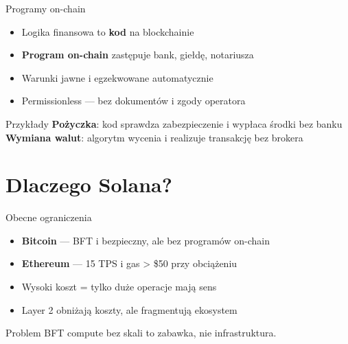 \begin{frame}{Programy on-chain}
  \begin{itemize}
    \item Logika finansowa to \textbf{kod} na blockchainie
    \item \textbf{Program on-chain} zastępuje bank, giełdę, notariusza
    \item Warunki jawne i egzekwowane automatycznie
    \item Permissionless --- bez dokumentów i zgody operatora
  \end{itemize}
  \vspace{0.3cm}
  \begin{exampleblock}{Przykłady}
    \textbf{Pożyczka}: kod sprawdza zabezpieczenie i wypłaca środki bez banku\\
    \textbf{Wymiana walut}: algorytm wycenia i realizuje transakcję bez brokera
  \end{exampleblock}
\end{frame}

\section{Dlaczego Solana?}

\begin{frame}{Obecne ograniczenia}
  \begin{itemize}
    \item \textbf{Bitcoin} --- BFT i bezpieczny, ale bez programów on-chain
    \item \textbf{Ethereum} --- 15 TPS i gas \textgreater{} \$50 przy obciążeniu
    \item Wysoki koszt = tylko duże operacje mają sens
    \item Layer 2 obniżają koszty, ale fragmentują ekosystem
  \end{itemize}
  \vspace{0.3cm}
  \begin{alertblock}{Problem}
    BFT compute bez skali to zabawka, nie infrastruktura.
  \end{alertblock}
\end{frame}

